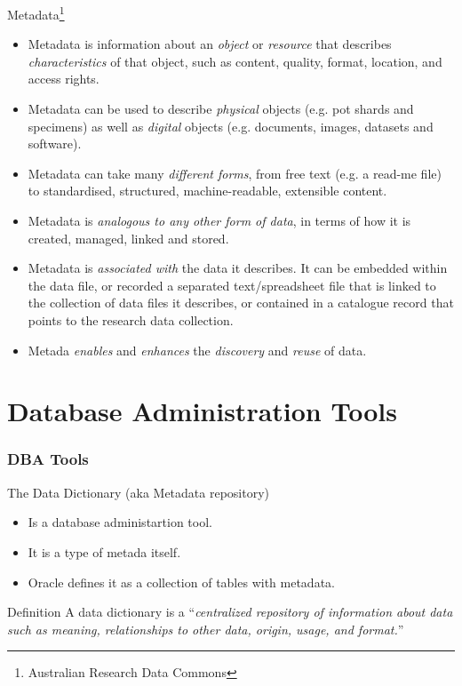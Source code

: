 \documentclass{beamer}
\begin{document}
\begin{frame}{Metadata\footnote{Australian Research Data Commons}}
    \footnotesize
    \begin{minipage}{.49\textwidth}
        \begin{itemize}
            \item Metadata is information about an \textit{object} or \textit{resource} that describes \textit{characteristics} of that object, such as content, quality, format, location, and access rights.\pause
            \item Metadata can be used to describe \textit{physical} objects (e.g. pot shards and specimens) as well as \textit{digital} objects (e.g. documents, images, datasets and software).\pause
            \item Metadata can take many \textit{different forms}, from free text (e.g. a read-me file) to standardised, structured, machine-readable, extensible content.\pause
        \end{itemize}
    \end{minipage}
    \begin{minipage}{.49\textwidth}
        \begin{itemize}
            \item Metadata is \textit{analogous to any other form of data}, in terms of how it is created, managed, linked and stored.\pause
            \item Metadata is \textit{associated with} the data it describes.  It can be embedded within the data file, or recorded a separated text/spreadsheet file that is linked to the collection of data files it describes, or contained in a catalogue record that points to the research data collection.\pause
            \item Metada \textit{enables} and \textit{enhances} the \textit{discovery} and \textit{reuse} of data.\pause
        \end{itemize}
    \end{minipage}
\end{frame}

\section{Database Administration Tools}

\begin{frame}
    \frametitle{DBA Tools}
    The Data Dictionary (aka Metadata repository)
    \begin{itemize}
        \item Is a database administartion tool.
        \item It is a type of metada itself.
        \item Oracle defines it as a collection of tables with metadata.
    \end{itemize}

    \begin{alertblock}{Definition}
        A data dictionary is a ``\textit{centralized repository of information about data such as meaning, relationships to other data, origin, usage, and format.}''
    \end{alertblock}
\end{frame}
\end{document}
